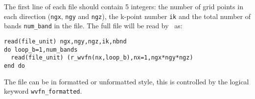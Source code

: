 The first line of each file should contain 5 integers: the number of
 grid points in each direction (\verb#ngx#, \verb#ngy# and
 \verb#ngz#), the k-point number \verb#ik# and the total number of
 bands \verb#num_band# in the file. The full file will be read by \wannier\ as:

\begin{verbatim}
read(file_unit) ngx,ngy,ngz,ik,nbnd
do loop_b=1,num_bands
  read(file_unit) (r_wvfn(nx,loop_b),nx=1,ngx*ngy*ngz)
end do
\end{verbatim}

The file can be in formatted or unformatted style, this is controlled
by the logical keyword \verb#wvfn_formatted#. 



